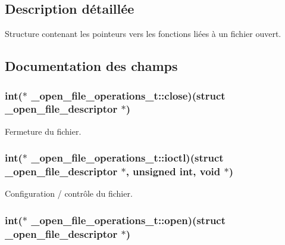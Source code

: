 \subsection{Description détaillée}
Structure contenant les pointeurs vers les fonctions liées à un fichier ouvert. 

\subsection{Documentation des champs}
\hypertarget{struct__open__file__operations__t_a187ebd3d665fde0a486bd7f5d3001f00}{
\subsubsection[{close}]{\setlength{\rightskip}{0pt plus 5cm}int($\ast$ \-\_\-open\-\_\-file\-\_\-operations\-\_\-t\-::close)(struct {\bf \-\_\-open\-\_\-file\-\_\-descriptor} $\ast$)}}\label{struct__open__file__operations__t_a187ebd3d665fde0a486bd7f5d3001f00}
Fermeture du fichier. \hypertarget{struct__open__file__operations__t_ab71efab6158837196ad4fef57565dddc}{
\subsubsection[{ioctl}]{\setlength{\rightskip}{0pt plus 5cm}int($\ast$ \-\_\-open\-\_\-file\-\_\-operations\-\_\-t\-::ioctl)(struct {\bf \-\_\-open\-\_\-file\-\_\-descriptor} $\ast$, unsigned int, void $\ast$)}}\label{struct__open__file__operations__t_ab71efab6158837196ad4fef57565dddc}
Configuration / contrôle du fichier. \hypertarget{struct__open__file__operations__t_a22018bcaef028f486c45838ba983c170}{
\subsubsection[{open}]{\setlength{\rightskip}{0pt plus 5cm}int($\ast$ \-\_\-open\-\_\-file\-\_\-operations\-\_\-t\-::open)(struct {\bf \-\_\-open\-\_\-file\-\_\-descriptor} $\ast$)}}\label{struct__open__file__operations__t_a22018bcaef028f486c45838ba983c170}
